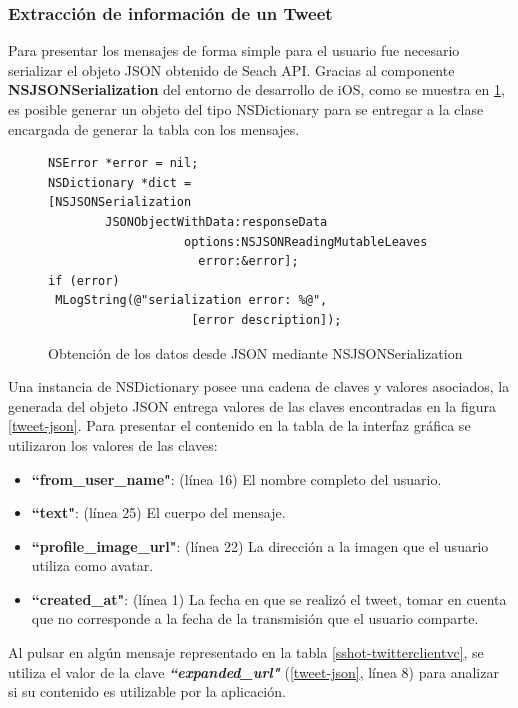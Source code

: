 		
		\subsubsection{Extracción de información de un Tweet}
Para presentar los mensajes de forma simple para el usuario fue necesario serializar el objeto JSON obtenido de Seach API. Gracias al componente \textbf{NSJSONSerialization} del entorno de desarrollo de iOS, como se muestra en \ref{json-serialization}, es posible generar un objeto del tipo NSDictionary para se entregar a la clase encargada de generar la tabla con los mensajes.

\begin{figure}[H]
	\centering
\begin{lstlisting}
NSError *error = nil;
NSDictionary *dict =
[NSJSONSerialization 
		JSONObjectWithData:responseData 
				   options:NSJSONReadingMutableLeaves
                   	 error:&error];
if (error) 
 MLogString(@"serialization error: %@",
 					[error description]);
\end{lstlisting}
	\caption{Obtención de los datos desde JSON mediante NSJSONSerialization}
	\label{json-serialization}
\end{figure}	

Una instancia de NSDictionary posee una cadena de claves y valores asociados, la generada del objeto JSON entrega valores de las claves encontradas en la figura \ref{tweet-json}.
Para presentar el contenido en la tabla de la interfaz gráfica se utilizaron los valores de las claves:
\begin{itemize}
\item \textbf{\textquotedblleft from\_user\_name"}: (línea 16) El nombre completo del usuario.
\item \textbf{\textquotedblleft text"}: (línea 25) El cuerpo del mensaje.
\item \textbf{\textquotedblleft profile\_image\_url"}: (línea 22) La dirección a la imagen que el usuario utiliza como avatar.
\item \textbf{\textquotedblleft created\_at"}: (línea 1) La fecha en que se realizó el tweet, tomar en cuenta que no corresponde a la fecha de la transmisión que el usuario comparte. 
\end{itemize}
Al pulsar en algún mensaje representado en la tabla \ref{sshot-twitterclientvc}, se utiliza el valor de la clave \textit{\textbf{\textquotedblleft expanded\_url"}} (\ref{tweet-json}, línea 8) para analizar si su contenido es utilizable por la aplicación.

